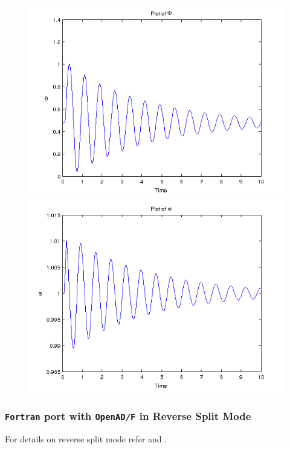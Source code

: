 \begin{figure}[h]
\centering
\includegraphics[width=1.2\linewidth]{../Code/miniApps/power_grid/phi_fortran_ca.png}
\label{fig:plot_of_phi_fortran_ca}
\includegraphics[width=1.2\linewidth]{../Code/miniApps/power_grid/omega_fortran_ca.png}
\label{fig:plot_of_omega_fortran_ca}
\end{figure}
\clearpage
\subsubsection{\texttt{Fortran} port with \texttt{OpenAD/F} in Reverse Split Mode}
For details on reverse split mode refer \cite{Griewank_2008} and \cite{Utke_2014}.\\

